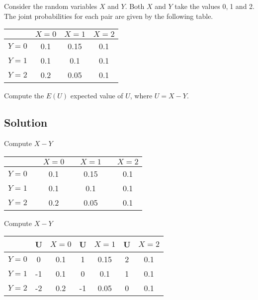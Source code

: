 \documentclass[a4paper,12pt]{article}
\begin{document}
	\large 
\noindent Consider the random variables $X$ and $Y$. Both $X$ and $Y$ take the values 0,$\;$1 and 2. The joint probabilities for each pair are given by the following table.
	\begin{center}
		\begin{tabular}{|c|c|c|c|}
			\hline  & $X=0$ & $X=1$ & $X=2$ \\ 
			\hline $Y=0$ & 0.1 & 0.15 & 0.1 \\ 
			\hline $Y=1$ & 0.1 & 0.1 & 0.1 \\ 
			\hline $Y=2$ & 0.2 & 0.05 & 0.1 \\ 
			\hline 
		\end{tabular} 
	\end{center}
\noindent Compute the $E(U)$ expected value of $U$, where $U=X-Y$.
	
	
\subsection*{Solution}	
	
	
\noindent Compute $X-Y$
	\begin{center}
		\begin{tabular}{|c|cc|cc|cc|}
			\hline  & \phantom{space}&$X=0$ &\phantom{space} & $X=1$ & \phantom{space}& $X=2$ \\ 
			\hline $Y=0$& & 0.1 & & 0.15 & & 0.1 \\ 
			\hline $Y=1$& & 0.1 & & 0.1 & & 0.1 \\ 
			\hline $Y=2$& & 0.2 & & 0.05 & & 0.1 \\ 
			\hline 
		\end{tabular} 
	\end{center}
	
	
\noindent Compute $X-Y$
	\begin{center}
		\begin{tabular}{|c|cc|cc|cc|}
			\hline  & \phantom{sp}U \phantom{s}&$X=0$ &\phantom{sp}U \phantom{s} & $X=1$ & \phantom{sp}U\phantom{s}& $X=2$ \\ 
			\hline $Y=0$& 0 & 0.1 & 1 & 0.15 & 2& 0.1 \\ 
			\hline $Y=1$& -1& 0.1 & 0& 0.1 & 1& 0.1 \\ 
			\hline $Y=2$& -2 & 0.2 & -1 & 0.05 & 0 & 0.1 \\ 
			\hline 
		\end{tabular} 
	\end{center}
	\bigskip
	
\end{document}
